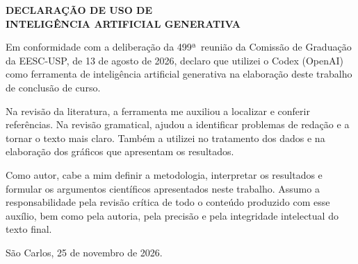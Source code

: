 \begingroup
\setlength{\parindent}{0pt}
\setlength{\parskip}{0.8\baselineskip}
\thispagestyle{empty}
\begin{center}
  \ABNTEXchapterfont\large\bfseries
  DECLARAÇÃO DE USO DE\\
  INTELIGÊNCIA ARTIFICIAL GENERATIVA
\end{center}

Em conformidade com a deliberação da 499ª~reunião da Comissão de Graduação da EESC-USP, de 13 de agosto de 2026, declaro que utilizei o Codex (OpenAI) como ferramenta de inteligência artificial generativa na elaboração deste trabalho de conclusão de curso.

Na revisão da literatura, a ferramenta me auxiliou a localizar e conferir referências. Na revisão gramatical, ajudou a identificar problemas de redação e a tornar o texto mais claro. Também a utilizei no tratamento dos dados e na elaboração dos gráficos que apresentam os resultados.

Como autor, cabe a mim definir a metodologia, interpretar os resultados e formular os argumentos científicos apresentados neste trabalho. Assumo a responsabilidade pela revisão crítica de todo o conteúdo produzido com esse auxílio, bem como pela autoria, pela precisão e pela integridade intelectual do texto final.

\begin{flushright}
  São Carlos, 25 de novembro de 2026.\\
  \imprimirautor
\end{flushright}

